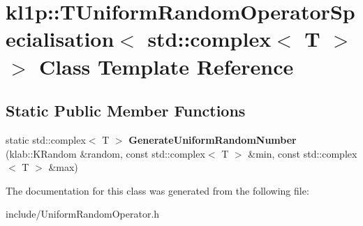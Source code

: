 \hypertarget{classkl1p_1_1TUniformRandomOperatorSpecialisation_3_01std_1_1complex_3_01T_01_4_01_4}{}\section{kl1p\+:\+:T\+Uniform\+Random\+Operator\+Specialisation$<$ std\+:\+:complex$<$ T $>$ $>$ Class Template Reference}
\label{classkl1p_1_1TUniformRandomOperatorSpecialisation_3_01std_1_1complex_3_01T_01_4_01_4}
\subsection*{Static Public Member Functions}
\begin{DoxyCompactItemize}
\item 
static std\+::complex$<$ T $>$ {\bfseries Generate\+Uniform\+Random\+Number} (klab\+::\+K\+Random \&random, const std\+::complex$<$ T $>$ \&min, const std\+::complex$<$ T $>$ \&max)\hypertarget{classkl1p_1_1TUniformRandomOperatorSpecialisation_3_01std_1_1complex_3_01T_01_4_01_4_aacfe06cefafa154e9f81d2878d3cc4b7}{}\label{classkl1p_1_1TUniformRandomOperatorSpecialisation_3_01std_1_1complex_3_01T_01_4_01_4_aacfe06cefafa154e9f81d2878d3cc4b7}

\end{DoxyCompactItemize}


The documentation for this class was generated from the following file\+:\begin{DoxyCompactItemize}
\item 
include/Uniform\+Random\+Operator.\+h\end{DoxyCompactItemize}
